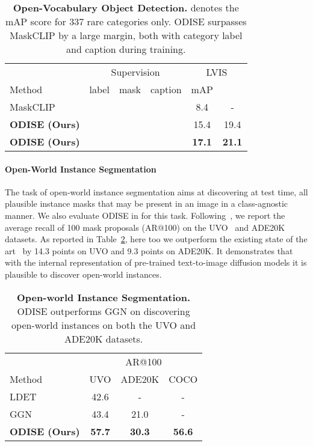 \documentclass[10pt,twocolumn,letterpaper]{article}
\newcommand{\cmark}{\ding{51}}
\newcommand{\tablestyle}[2]{\setlength{\tabcolsep}{#1}\renewcommand{\arraystretch}{#2}\centering\small}
\newcommand{\ourmethod}{ODISE}
\begin{document}
\begin{table}[h]
\tablestyle{7pt}{1.1}
\begin{tabular}{l|ccc|cc}
                            & \multicolumn{3}{c}{Supervision} & \multicolumn{2}{c}{LVIS}       \\
Method                      & label    & mask     & caption   & mAP           &  \\
\shline
MaskCLIP\cite{ding2022open} & \cmark   & \cmark   &           & 8.4           & -              \\
\hline
\hline
\textbf{\ourmethod{} (Ours)}   & \cmark   & \cmark   &           & 15.4          & 19.4           \\
\textbf{\ourmethod{} (Ours)}   &          & \cmark   & \cmark    & \textbf{17.1} & \textbf{21.1} 
\end{tabular}
\vspace{-.5em}
\caption{
\label{tab:object}
  \textbf{Open-Vocabulary Object Detection.}  denotes the mAP score for 337 rare categories only. \ourmethod{} surpasses MaskCLIP by a large margin, both with category label and caption  during training.
}
\vspace{-1em}
\end{table}


\paragraph{Open-World Instance Segmentation}
The task of open-world instance segmentation aims at discovering at test time, all plausible instance masks that may be present in an image in a class-agnostic manner. 
We also evaluate \ourmethod{} in for this task.
Following~\cite{wang2022ggn}, we report the average recall of 100 mask proposals (AR@100) on the UVO~\cite{wang2021uvo} and ADE20K~\cite{zhou2019ade} datasets.
As reported in Table~\ref{tab:instance}, here too we outperform the existing state of the art~\cite{wang2022ggn} by 14.3 points on UVO and 9.3 points on ADE20K.
It demonstrates that with the internal representation of pre-trained text-to-image diffusion models it is plausible to discover open-world instances.

\begin{table}[h]
\tablestyle{7pt}{1.1}
\begin{tabular}{l|ccc}
                            & \multicolumn{3}{c}{AR@100}                    \\
Method                    & UVO           & ADE20K        & COCO          \\
\shline
LDET\cite{kim2022ldet}    & 42.6          & -             & -             \\
GGN\cite{wang2022ggn}     & 43.4          & 21.0          & -             \\
\textbf{\ourmethod{} (Ours)} & \textbf{57.7} & \textbf{30.3} & \textbf{56.6}
\end{tabular}
\vspace{-.5em}
\caption{
    \label{tab:instance}
    \textbf{Open-world Instance Segmentation.} \ourmethod{} outperforms GGN on discovering open-world instances on both the UVO and ADE20K datasets.
}
\vspace{-1em}
\end{table}
\end{document}
